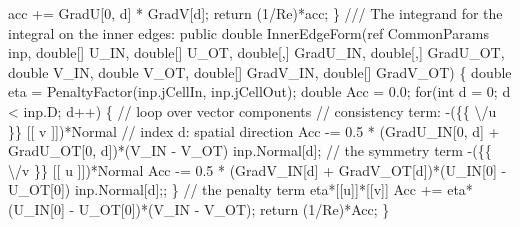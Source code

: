 {\btab \btab \btab acc += GradU[0, d] * GradV[d];\newline 
\btab \btab return (1/Re)*acc;\newline 
\btab \}\newline 
 \newline 
 \newline 
    /// The integrand for the integral on the inner edges:
\btab public double InnerEdgeForm(ref CommonParams inp, \newline 
\btab \btab double[] U\_IN, double[] U\_OT, double[,] GradU\_IN, double[,] GradU\_OT, \newline 
\btab \btab double V\_IN, double V\_OT, double[] GradV\_IN, double[] GradV\_OT) \{\newline 
 \newline 
\btab \btab double eta = PenaltyFactor(inp.jCellIn, inp.jCellOut);\newline 
 \newline 
\btab \btab double Acc = 0.0;\newline 
\btab \btab for(int d = 0; d < inp.D; d++) \{ // loop over vector components \newline 
\btab \btab \btab // consistency term: -(\{\{ \textbackslash /u \}\} [[ v ]])*Normal\newline 
\btab \btab \btab // index d: spatial direction\newline 
\btab \btab \btab Acc -= 0.5 * (GradU\_IN[0, d] + GradU\_OT[0, d])*(V\_IN - V\_OT)\newline 
\btab \btab \btab \btab \btab    * inp.Normal[d];\newline 
 \newline 
\btab \btab \btab // the symmetry term -(\{\{ \textbackslash /v \}\} [[ u ]])*Normal\newline 
\btab \btab \btab Acc -= 0.5 * (GradV\_IN[d] + GradV\_OT[d])*(U\_IN[0] - U\_OT[0])\newline 
\btab \btab \btab \btab \btab    * inp.Normal[d];;\newline 
\btab \btab \}\newline 
 \newline 
\btab \btab // the penalty term eta*[[u]]*[[v]]\newline 
\btab \btab Acc += eta*(U\_IN[0] - U\_OT[0])*(V\_IN - V\_OT);\newline 
\btab \btab return (1/Re)*Acc;\newline 
 \newline 
\btab \}\newline 
 \newline 
}
